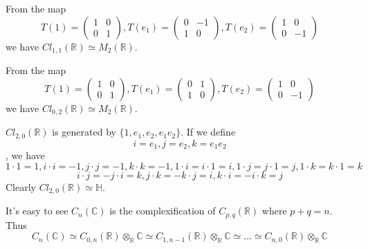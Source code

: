 \documentclass[12pt]{book}
\begin{document}
	From the map 
	\begin{equation}
		T(1)=\begin{pmatrix}
			1&0\\
			0&1
		\end{pmatrix},
		T(e_1)=\begin{pmatrix}
			0&-1\\
			1&0
		\end{pmatrix},
		T(e_2)=\begin{pmatrix}
			1&0\\
			0&-1
		\end{pmatrix}
	\end{equation}
	we have $Cl_{1,1}(\mathbb R)\simeq M_2(\mathbb R)$.
	
	From the map 
	\begin{equation}
		T(1)=\begin{pmatrix}
			1&0\\
			0&1
		\end{pmatrix},
		T(e_1)=\begin{pmatrix}
			0&1\\
			1&0
		\end{pmatrix},
		T(e_2)=\begin{pmatrix}
			1&0\\
			0&-1
		\end{pmatrix}
	\end{equation}
	we have $Cl_{0,2}(\mathbb R)\simeq M_2(\mathbb R)$.
	
	
	$Cl_{2,0}(\mathbb R)$ is generated by $\{1,e_1,e_2,e_1e_2\}$. If we define
	\begin{equation}
		i=e_1,j=e_2,k=e_1e_2
	\end{equation}
	, we have
	\begin{equation}
		1\cdot 1=1, i\cdot i=-1, j\cdot j=-1, k\cdot k=-1, 1\cdot i=i \cdot 1=i, 1\cdot j=j \cdot 1=j, 1\cdot k=k \cdot 1=k
	\end{equation}
	\begin{equation}
		i\cdot j=-j \cdot i=k, j\cdot k=-k \cdot j=i, k\cdot i=-i \cdot k=j
	\end{equation}
	Clearly $Cl_{2,0}(\mathbb R)\simeq \mathbb H$.
	
	It's easy to see $C_n(\mathbb C)$ is the complexification of $C_{p,q}(\mathbb R)$ where $p+q=n$. Thus
	\begin{equation}
		C_n(\mathbb C)\simeq C_{0,n}(\mathbb R)\otimes_{\mathbb R}\mathbb C\simeq C_{1,n-1}(\mathbb R)\otimes_{\mathbb R}\mathbb C\simeq \dots\simeq C_{n,0}(\mathbb R)\otimes_{\mathbb R}\mathbb C
	\end{equation}
	
\end{document}
